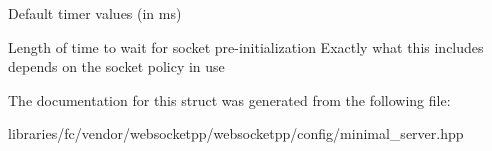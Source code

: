 Default timer values (in ms) 

Length of time to wait for socket pre-\/initialization Exactly what this includes depends on the socket policy in use 

The documentation for this struct was generated from the following file\+:\begin{DoxyCompactItemize}
\item 
libraries/fc/vendor/websocketpp/websocketpp/config/minimal\+\_\+server.\+hpp\end{DoxyCompactItemize}
